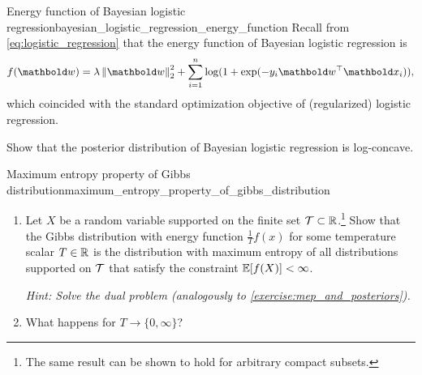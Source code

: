 \begin{nexercise}{Energy function of Bayesian logistic regression}{bayesian_logistic_regression_energy_function}
  Recall from \cref{eq:logistic_regression} that the energy function of Bayesian logistic regression is \begin{align}
    f(\vw) = \lambda \norm{\vw}_2^2 + \sum_{i=1}^n \log(1 + \exp(-y_i \transpose{\vw} \vx_i)),
  \end{align} which coincided with the standard optimization objective of (regularized) logistic regression.

  Show that the posterior distribution of Bayesian logistic regression is log-concave.
\end{nexercise}

\begin{nexercise}{Maximum entropy property of Gibbs distribution}{maximum_entropy_property_of_gibbs_distribution}
  \begin{enumerate}
    \item Let $X$ be a random variable supported on the finite set $\mathcal{T} \subset \mathbb{R}$.\footnote{The same result can be shown to hold for arbitrary compact subsets.}
    Show that the Gibbs distribution with energy function $\frac{1}{T} f(x)$ for some temperature scalar $T \in \mathbb{R}$ is the distribution with maximum entropy of all distributions supported on $\mathcal{T}$ that satisfy the constraint $\E{f(X)} < \infty$.\par
    \textit{Hint: Solve the dual problem (analogously to \cref{exercise:mep_and_posteriors}).}

    \item What happens for $T \to \{0, \infty\}$?
  \end{enumerate}
\end{nexercise}

